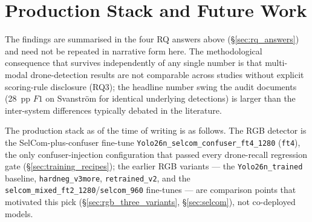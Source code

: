 \documentclass[12pt,a4paper,oneside,openright]{book}
\begin{document}
\section{Production Stack and Future Work}
\label{sec:production_stack}


The findings are summarised in the four RQ answers above (\S\ref{sec:rq_answers}) and need not be repeated in narrative form here. The methodological consequence that survives independently of any single number is that multi-modal drone-detection results are not comparable across studies without explicit scoring-rule disclosure (RQ3); the headline number swing the audit documents (28~pp $F1$ on Svanstr\"om for identical underlying detections) is larger than the inter-system differences typically debated in the literature.

The production stack as of the time of writing is as follows. The RGB detector is the SelCom-plus-confuser fine-tune \texttt{Yolo26n\_selcom\_confuser\_ft4\_1280} (\texttt{ft4}), the only confuser-injection configuration that passed every drone-recall regression gate (\S\ref{sec:training_recipes}); the earlier RGB variants --- the \texttt{Yolo26n\_trained} baseline, \texttt{hardneg\_v3more}, \texttt{retrained\_v2}, and the \texttt{selcom\_mixed\_ft2\_1280}/\texttt{selcom\_960} fine-tunes --- are comparison points that motivated this pick (\S\ref{sec:rgb_three_variants}, \S\ref{sec:selcom}), not co-deployed models.
\end{document}

